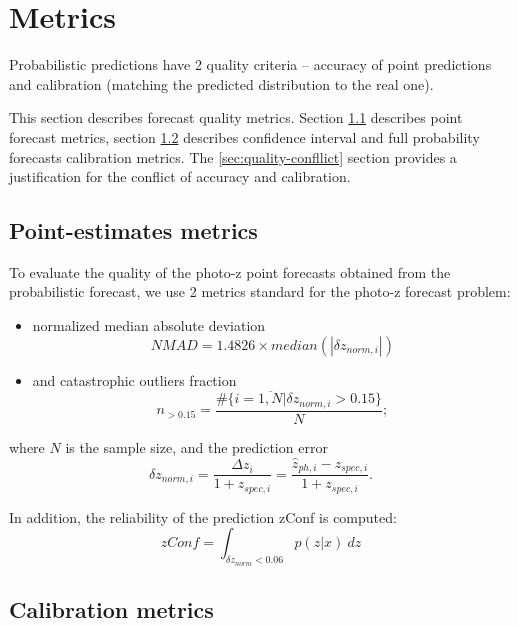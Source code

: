 \documentclass[fleqn,usenatbib]{mnras}
\begin{document}
\section{Metrics}\label{sec:metrics}

Probabilistic predictions have 2 quality criteria -- accuracy of point predictions and calibration (matching the predicted distribution to the real one).

This section describes forecast quality metrics. Section \ref{sec:point-metrics} describes point forecast metrics, section \ref{sec:calibration-metrics} describes confidence interval and full probability forecasts calibration metrics. The \ref{sec:quality-confllict} section provides a justification for the conflict of accuracy and calibration.

\subsection{Point-estimates metrics}\label{sec:point-metrics}

To evaluate the quality of the photo-z point forecasts obtained from the probabilistic forecast, we use 2 metrics standard for the photo-z forecast problem:
\begin{itemize}
    \item normalized median absolute deviation \begin{equation}\label{eq:nmad}
        NMAD = 1.4826 \times median(|\delta z_{norm,i}|)
    \end{equation}
    \item and catastrophic outliers fraction \begin{equation}\label{eq:n015}
        n_{>0.15} = \frac{\#\{i = \overline{1, N} | \delta z_{norm, i} > 0.15\}}{N};
    \end{equation}
\end{itemize}
where \(N\) is the sample size, and the prediction error \begin{equation}\label{eq:dznorm}
    \delta z_{norm,i} = \frac{\Delta z_i}{1+z_{spec,i}} = \frac{\hat{z}_{ph,i} - z_{spec,i}}{1+z_{spec,i}}.
\end{equation}

In addition, the reliability of the prediction zConf is computed: \begin{equation}\label{eq:zconf}
    zConf = \int_{\delta z_{norm} < 0.06} p(z|x)~dz
\end{equation}

\subsection{Calibration metrics}\label{sec:calibration-metrics}
\end{document}
